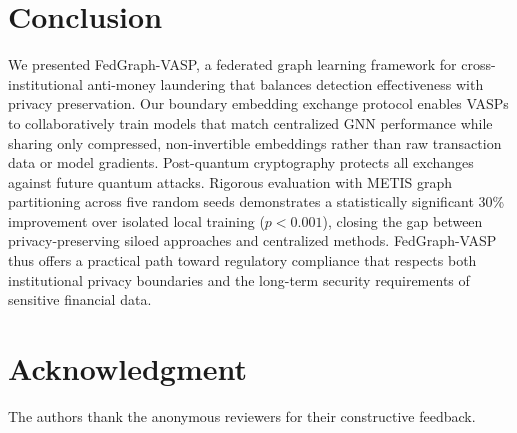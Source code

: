 \documentclass[conference]{IEEEtran}
\begin{document}
\section{Conclusion}

We presented FedGraph-VASP, a federated graph learning framework for cross-institutional anti-money laundering that balances detection effectiveness with privacy preservation. Our boundary embedding exchange protocol enables VASPs to collaboratively train models that match centralized GNN performance while sharing only compressed, non-invertible embeddings rather than raw transaction data or model gradients. Post-quantum cryptography protects all exchanges against future quantum attacks. Rigorous evaluation with METIS graph partitioning across five random seeds demonstrates a statistically significant 30\% improvement over isolated local training ($p < 0.001$), closing the gap between privacy-preserving siloed approaches and centralized methods. FedGraph-VASP thus offers a practical path toward regulatory compliance that respects both institutional privacy boundaries and the long-term security requirements of sensitive financial data.

\section*{Acknowledgment}
The authors thank the anonymous reviewers for their constructive feedback.



\end{document}
